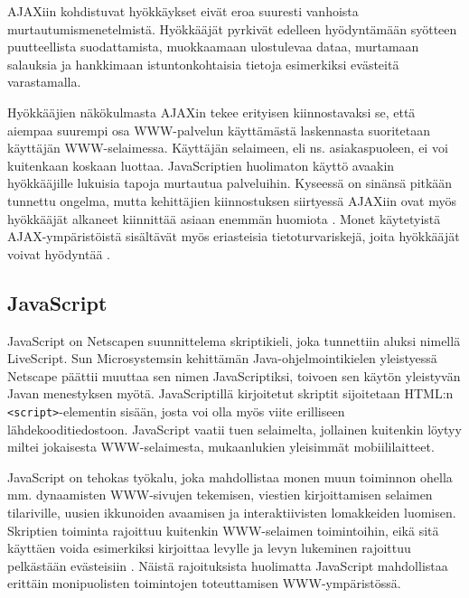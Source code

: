 AJAXiin kohdistuvat hyökkäykset eivät eroa suuresti vanhoista
murtautumismenetelmistä. Hyökkääjät pyrkivät edelleen hyödyntämään
syötteen puutteellista suodattamista, muokkaamaan ulostulevaa dataa,
murtamaan salauksia ja hankkimaan istuntonkohtaisia tietoja
esimerkiksi evästeitä varastamalla.

Hyökkääjien näkökulmasta AJAXin tekee erityisen kiinnostavaksi se,
että aiempaa suurempi osa WWW-palvelun käyttämästä laskennasta
suoritetaan käyttäjän WWW-selaimessa. Käyttäjän selaimeen, eli
ns. asiakaspuoleen, ei voi kuitenkaan koskaan luottaa.
JavaScriptien huolimaton käyttö avaakin hyökkääjille lukuisia tapoja
murtautua palveluihin. Kyseessä on sinänsä pitkään tunnettu ongelma,
mutta kehittäjien kiinnostuksen siirtyessä AJAXiin ovat myös
hyökkääjät alkaneet kiinnittää asiaan enemmän huomiota \cite{AJAX}.
Monet käytetyistä AJAX-ympäristöistä sisältävät myös eriasteisia
tietoturvariskejä, joita hyökkääjät voivat hyödyntää \cite{JSH}.

\subsection{JavaScript}

JavaScript on Netscapen suunnittelema skriptikieli, joka tunnettiin
aluksi nimellä LiveScript. Sun Microsystemsin kehittämän
Java-ohjelmointikielen yleistyessä Netscape päättii muuttaa sen nimen
JavaScriptiksi, toivoen sen käytön yleistyvän Javan menestyksen
myötä. JavaScriptillä kirjoitetut skriptit sijoitetaan HTML:n
\texttt{<script>}-elementin sisään, josta voi olla myös viite
erilliseen lähdekooditiedostoon. JavaScript vaatii tuen selaimelta,
jollainen kuitenkin löytyy miltei jokaisesta WWW-selaimesta, mukaanlukien
yleisimmät mobiililaitteet.


JavaScript on tehokas työkalu, joka mahdollistaa monen muun toiminnon
ohella mm. dynaamisten WWW-sivujen tekemisen, viestien kirjoittamisen
selaimen tilariville, uusien ikkunoiden avaamisen ja interaktiivisten
lomakkeiden luomisen. Skriptien toiminta rajoittuu kuitenkin
WWW-selaimen toimintoihin, eikä sitä käyttäen voida esimerkiksi
kirjoittaa levylle ja levyn lukeminen rajoittuu pelkästään evästeisiin
\cite{JavaScript}. Näistä rajoituksista huolimatta JavaScript
mahdollistaa erittäin monipuolisten toimintojen toteuttamisen
WWW-ympäristössä.


